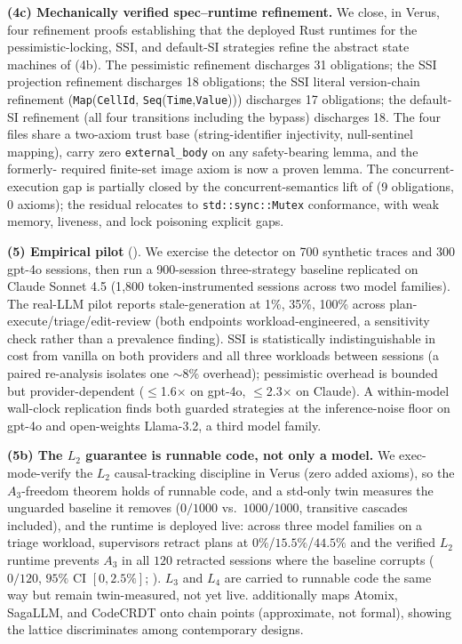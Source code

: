 \documentclass[journal,compsoc,10pt]{IEEEtran}
\theoremstyle{definition}
\theoremstyle{remark}
\begin{document}
\medskip
\noindent\textbf{(4c) Mechanically verified spec--runtime
refinement.} We close, in Verus, four refinement proofs
establishing that the deployed Rust runtimes for the
pessimistic-locking, SSI, and default-SI strategies refine the
abstract state machines of (4b). The pessimistic refinement
discharges 31 obligations; the SSI projection refinement discharges
18 obligations; the SSI literal version-chain refinement
(\texttt{Map}(\texttt{CellId},
\texttt{Seq}(\texttt{Time},\texttt{Value}))) discharges 17
obligations; the default-SI refinement (all four transitions including
the bypass) discharges 18. The four files share a two-axiom trust base
(string-identifier injectivity, null-sentinel mapping), carry zero
\texttt{external\_body} on any safety-bearing lemma, and the formerly-%
required finite-set image axiom is now a proven lemma. The
concurrent-execution gap is partially closed by the concurrent-semantics
lift of  (9 obligations, 0 axioms); the
residual relocates to \texttt{std::sync::Mutex} conformance, with weak
memory, liveness, and lock poisoning explicit gaps.

\medskip
\noindent\textbf{(5) Empirical pilot} ().
We exercise the detector on 700 synthetic traces and 300 gpt-4o sessions,
then run a 900-session three-strategy baseline replicated on Claude Sonnet
4.5 (1{,}800 token-instrumented sessions across two model families). The
real-LLM pilot reports stale-generation at 1\%, 35\%, 100\% across
plan-execute/triage/edit-review (both endpoints workload-engineered, a
sensitivity check rather than a prevalence finding). SSI is statistically
indistinguishable in cost from vanilla on both providers and all three
workloads between sessions (a paired re-analysis isolates one ${\sim}8\%$
overhead); pessimistic overhead is bounded but provider-dependent
($\leq$1.6$\times$ on gpt-4o, $\leq$2.3$\times$ on Claude). A within-model
wall-clock replication finds both guarded strategies at the inference-noise
floor on gpt-4o and open-weights Llama-3.2, a third model family.

\medskip
\noindent\textbf{(5b) The $L_2$ guarantee is runnable code, not only a
model.} We exec-mode-verify the $L_2$ causal-tracking discipline in Verus
(zero added axioms), so the $A_3$-freedom theorem holds of runnable code, and
a std-only twin measures the unguarded baseline it removes ($0/1000$ vs.\
$1000/1000$, transitive cascades included), and the runtime is deployed live:
across three model families on a triage workload, supervisors retract plans at
$0\%$/$15.5\%$/$44.5\%$ and the verified $L_2$ runtime prevents $A_3$ in all
$120$ retracted sessions where the baseline corrupts ($0/120$, $95\%$ CI
$[0,2.5\%]$; \Cref{sec:l2-deployed}). $L_3$ and $L_4$ are carried to runnable
code the same way but remain twin-measured, not yet live. 
additionally maps Atomix, SagaLLM, and CodeCRDT onto chain points
(approximate, not formal), showing the lattice discriminates among
contemporary designs.
\end{document}
